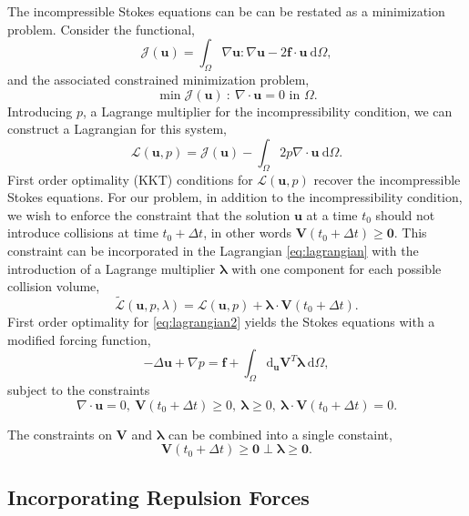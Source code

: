 \documentclass[preprint, 10pt]{elsarticle}
\begin{document}
The incompressible Stokes equations can be can be restated as a minimization problem. Consider the functional,
\[ \mathcal{J}(\mathbf{u}) = \int_{\Omega} \nabla\mathbf{u}:\nabla\mathbf{u} - 2\mathbf{f}\cdot\mathbf{u} ~\text{d}\Omega,\]
and the associated constrained minimization problem,
\[ \min \mathcal{J}(\mathbf{u}) ~:~ \nabla\cdot\mathbf{u} = 0 \text{ in }\Omega.\]
Introducing $p$, a Lagrange multiplier for the incompressibility condition, we can construct a Lagrangian for this system,
\begin{equation}\label{eq:lagrangian} \mathcal{L}(\mathbf{u},p) = \mathcal{J}(\mathbf{u}) - \int_{\Omega} 2p\nabla\cdot\mathbf{u}~\text{d}\Omega.\end{equation}
First order optimality (KKT) conditions for $\mathcal{L}(\mathbf{u},p)$ recover the incompressible Stokes equations. For our problem, in addition to the incompressibility condition, we wish to enforce the constraint that the solution $\mathbf{u}$ at a time $t_0$ should not introduce collisions at time $t_0+\Delta t$, in other words $\mathbf{V}(t_0 + \Delta t) \geq \mathbf{0}$.
This constraint can be incorporated in the Lagrangian \eqref{eq:lagrangian} with the introduction of a Lagrange multiplier $\pmb{\lambda}$ with one component for each possible collision volume,
\begin{equation}\label{eq:lagrangian2} \tilde{\mathcal{L}}(\mathbf{u},p,\lambda) = \mathcal{L}(\mathbf{u},p) + \pmb{\lambda} \cdot \mathbf{V}(t_0+\Delta t).\end{equation}
First order optimality for \eqref{eq:lagrangian2} yields the Stokes equations with a modified forcing function,
\begin{equation}\label{eq:stokes_mod}-\Delta \mathbf{u} + \nabla p = \mathbf{f} + \int_{\Omega} \text{d}_{\mathbf{u}} \mathbf{V}^T\pmb{\lambda} ~\text{d}\Omega,\end{equation}
subject to the constraints
\[ \nabla\cdot\mathbf{u}  =0, ~\mathbf{V}(t_0 + \Delta t) \geq 0,~\pmb{\lambda} \geq 0, ~ \pmb{\lambda}\cdot\mathbf{V}(t_0+\Delta t) = 0.	\]

The constraints on $\mathbf{V}$ and $\pmb{\lambda}$ can be combined into a single constaint,
\begin{equation}\label{eq:ncp_constraint} \mathbf{V}(t_0 + \Delta t)\geq \mathbf{0} \perp \pmb{\lambda}\geq \mathbf{0}.\end{equation}


\subsection{Incorporating Repulsion Forces}
\end{document}
